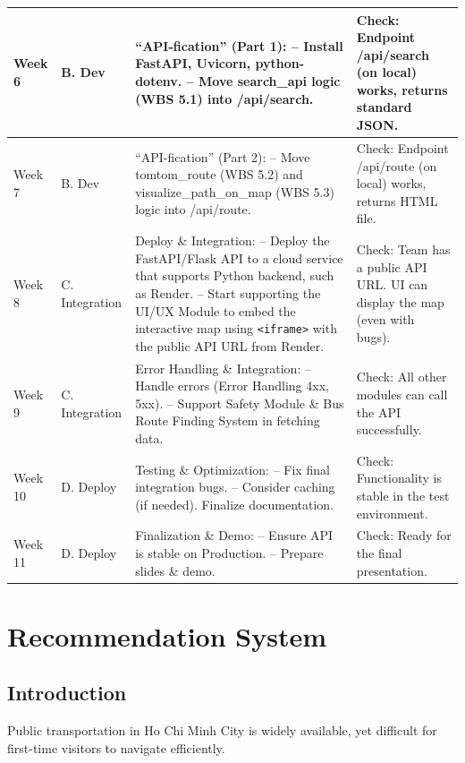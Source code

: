 \begin{longtable}{|>{\raggedright\arraybackslash}p{}|>{\raggedright\arraybackslash}p{}|>{\raggedright\arraybackslash}p{}|>{\raggedright\arraybackslash}p{}|}
\hline
Week 6 & B. Dev & ``API-fication'' (Part 1): \newline\quad -- Install FastAPI, Uvicorn, python-dotenv. \newline\quad -- Move search\_api logic (WBS 5.1) into /api/search. & Check: Endpoint /api/search (on local) works, returns standard JSON. \\
\hline
Week 7 & B. Dev & ``API-fication'' (Part 2): \newline\quad -- Move tomtom\_route (WBS 5.2) and visualize\_path\_on\_map (WBS 5.3) logic into /api/route. & Check: Endpoint /api/route (on local) works, returns HTML file. \\
\hline
Week 8 & C. Integration & Deploy \& Integration: \newline\quad -- Deploy the FastAPI/Flask API to a cloud service that supports Python backend, such as Render. \newline\quad -- Start supporting the UI/UX Module to embed the interactive map using \texttt{<iframe>} with the public API URL from Render. & Check: Team has a public API URL. UI can display the map (even with bugs). \\
\hline
Week 9 & C. Integration & Error Handling \& Integration: \newline\quad -- Handle errors (Error Handling 4xx, 5xx). \newline\quad -- Support Safety Module \& Bus Route Finding System in fetching data. & Check: All other modules can call the API successfully. \\
\hline
Week 10 & D. Deploy & Testing \& Optimization: \newline\quad -- Fix final integration bugs. \newline\quad -- Consider caching (if needed). Finalize documentation. & Check: Functionality is stable in the test environment. \\
\hline
Week 11 & D. Deploy & Finalization \& Demo: \newline\quad -- Ensure API is stable on Production. \newline\quad -- Prepare slides \& demo. & Check: Ready for the final presentation. \\
\hline
\end{longtable}

\section{Recommendation System}
\subsection{Introduction}
Public transportation in Ho Chi Minh City is widely available, yet difficult for first-time visitors to navigate efficiently.

